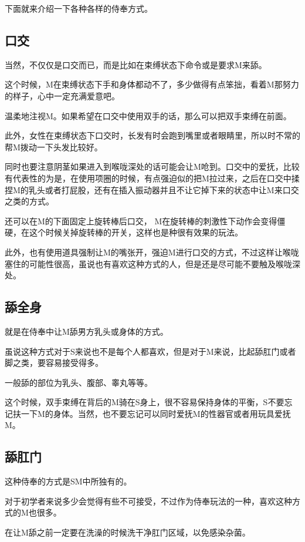 \documentclass[12pt,UTF8]{ctexbook}
\begin{document}
下面就来介绍一下各种各样的侍奉方式。 

\subsection{口交}

当然，不仅仅是口交而已，而是比如在束缚状态下命令或是要求M来舔。

这个时候，M在束缚状态下手和身体都动不了，多少做得有点笨拙，看着M那努力的样子，心中一定充满爱意吧。

温柔地注视M。如果希望在口交中使用双手的话，那么可以把双手束缚在前面。

此外，女性在束缚状态下口交时，长发有时会跑到嘴里或者眼睛里，所以时不常的帮M拨动一下头发比较好。

同时也要注意阴茎如果进入到喉咙深处的话可能会让M呛到。口交中的爱抚，比较有代表性的为是，在使用项圈的时候，有点强迫似的把M拉过来，之后在口交中揉捏M的乳头或者打屁股，还有在插入振动器并且不让它掉下来的状态中让M来口交之类的方式。

还可以在M的下面固定上旋转棒后口交， M在旋转棒的刺激性下动作会变得僵硬，在这个时候关掉旋转棒的开关，这样也是种很有效果的玩法。

此外，也有使用道具强制让M的嘴张开，强迫M进行口交的方式，不过这样让喉咙塞住的可能性很高，虽说也有喜欢这种方式的人，但是还是尽可能不要触及喉咙深处。

\subsection{舔全身}

就是在侍奉中让M舔男方乳头或身体的方式。

虽说这种方式对于S来说也不是每个人都喜欢，但是对于M来说，比起舔肛门或者脚之类，要容易接受得多。

一般舔的部位为乳头、腹部、睾丸等等。

这个时候，双手束缚在背后的M骑在S身上，很不容易保持身体的平衡，S不要忘记扶一下M的身体。当然，也不要忘记可以同时爱抚M的性器官或者用玩具爱抚M。 

\subsection{舔肛门}

这种侍奉的方式是SM中所独有的。

对于初学者来说多少会觉得有些不可接受，不过作为侍奉玩法的一种，喜欢这种方式的M也很多。

在让M舔之前一定要在洗澡的时候洗干净肛门区域，以免感染杂菌。
\end{document}

